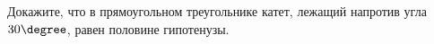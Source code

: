 \begin{ex}
	\begin{condition}
		Докажите, что в прямоугольном треугольнике катет, лежащий напротив угла \( 30\degree \), равен половине гипотенузы.
	\end{condition}
\end{ex}